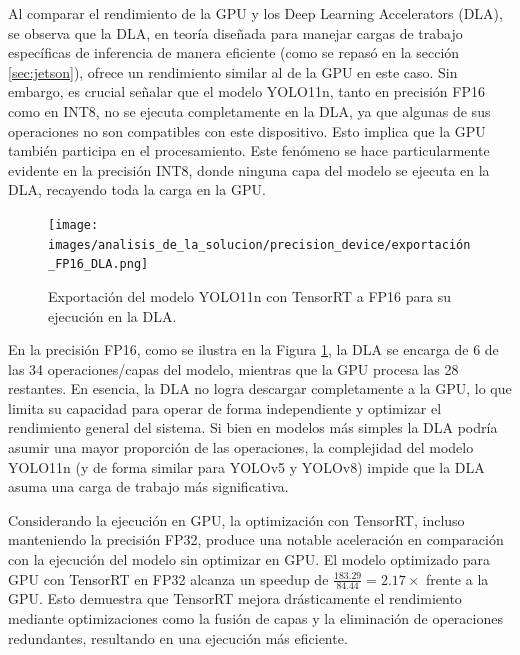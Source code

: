 \documentclass[11pt,spanish,listoffigures,listoftables]{tfgetsinf}
\begin{document}
Al comparar el rendimiento de la GPU y los Deep Learning Accelerators (DLA), se observa que la DLA, en teoría diseñada para manejar cargas de trabajo específicas de inferencia de manera eficiente (como se repasó en la sección \ref{sec:jetson}), ofrece un rendimiento similar al de la GPU en este caso. Sin embargo, es crucial señalar que el modelo YOLO11n, tanto en precisión FP16 como en INT8, no se ejecuta completamente en la DLA, ya que algunas de sus operaciones no son compatibles con este dispositivo. Esto implica que la GPU también participa en el procesamiento. Este fenómeno se hace particularmente evidente en la precisión INT8, donde ninguna capa del modelo se ejecuta en la DLA, recayendo toda la carga en la GPU.
\begin{figure}[H]
   \centering
   \texttt{[image: images/analisis\_de\_la\_solucion/precision\_device/exportación\_FP16\_DLA.png]}
   \caption[Exportación del modelo YOLO11n con TensorRT a FP16 para su ejecución en la DLA]{Exportación del modelo YOLO11n con TensorRT a FP16 para su ejecución en la DLA.}
   \label{fig:exportacion_FP16_DLA}
\end{figure}
En la precisión FP16, como se ilustra en la Figura \ref{fig:exportacion_FP16_DLA}, la DLA se encarga de 6 de las 34 operaciones/capas del modelo, mientras que la GPU procesa las 28 restantes. En esencia, la DLA no logra descargar completamente a la GPU, lo que limita su capacidad para operar de forma independiente y optimizar el rendimiento general del sistema. Si bien en modelos más simples la DLA podría asumir una mayor proporción de las operaciones, la complejidad del modelo YOLO11n (y de forma similar para YOLOv5 y YOLOv8) impide que la DLA asuma una carga de trabajo más significativa.

Considerando la ejecución en GPU, la optimización con TensorRT, incluso manteniendo la precisión FP32, produce una notable aceleración en comparación con la ejecución del modelo sin optimizar en GPU. El modelo optimizado para GPU con TensorRT en FP32 alcanza un speedup de $\frac{183.29}{84.44} = 2.17\times$ frente a la GPU. Esto demuestra que TensorRT mejora drásticamente el rendimiento mediante optimizaciones como la fusión de capas y la eliminación de operaciones redundantes, resultando en una ejecución más eficiente.
\end{document}
